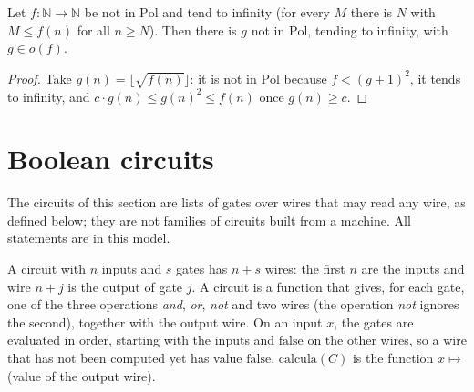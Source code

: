 \begin{theorem}
  \label{thm:machines-no-first}
  \leanok
  Let $f : \mathbb{N} \to \mathbb{N}$ be not in $\mathrm{Pol}$ and tend to infinity (for every $M$ there is $N$
  with $M \le f(n)$ for all $n \ge N$). Then there is $g$ not in $\mathrm{Pol}$, tending to infinity, with
  $g \in o(f)$.
\end{theorem}

\begin{proof}
  \leanok
  Take $g(n) = \lfloor \sqrt{f(n)} \rfloor$: it is not in $\mathrm{Pol}$ because $f < (g + 1)^2$, it tends to
  infinity, and $c \cdot g(n) \le g(n)^2 \le f(n)$ once $g(n) \ge c$.
\end{proof}

\section{Boolean circuits}
\label{sec:machines-circuits}

The circuits of this section are lists of gates over wires that may read any wire, as defined below; they are
not families of circuits built from a machine. All statements are in this model.

\begin{definition}
  \label{def:machines-circuit}
  \leanok
  A circuit with $n$ inputs and $s$ gates has $n + s$ wires: the first $n$ are the inputs and wire $n + j$ is
  the output of gate $j$. A circuit is a function that gives, for each gate, one of the three operations
  \emph{and}, \emph{or}, \emph{not} and two wires (the operation \emph{not} ignores the second), together with
  the output wire. On an input $x$, the gates are evaluated in order, starting with the inputs and $\mathrm{false}$
  on the other wires, so a wire that has not been computed yet has value $\mathrm{false}$. $\mathrm{calcula}(C)$ is
  the function $x \mapsto$ (value of the output wire).
\end{definition}

